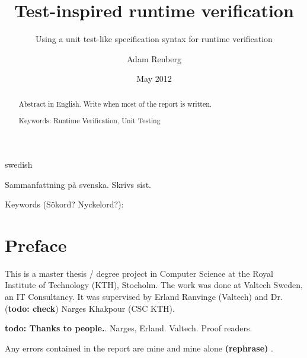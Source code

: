 \documentclass[a4paper,11pt]{kth-mag}
\title{Test-inspired runtime verification}
\subtitle{Using a unit test-like
specification syntax for runtime verification}
\author{Adam Renberg}
\date{May 2012}
\newcommand{\todo}[1]{\textbf{todo: #1}}
\newcommand{\rephrase}{\textbf{(rephrase)} }
\begin{document}
\lstset{basicstyle=\ttfamily, tabsize=2, showspaces=false,
showstringspaces=false, numbersep=20pt}

\frontmatter
\pagestyle{empty}
\removepagenumbers
\maketitle
{}





\begin{abstract}

Abstract in English. Write when most of the report is written.

\bigskip\noindent
Keywords: Runtime Verification, Unit Testing
\end{abstract}
\clearpage

\begin{foreignabstract}{swedish}

Sammanfattning på svenska. Skrivs sist.

\bigskip\noindent
Keywords (Sökord? Nyckelord?):
\end{foreignabstract}
\clearpage





\pagestyle{newchap}
\chapter*{Preface}

This is a master thesis / degree project in Computer Science at the Royal
Institute of Technology (KTH), Stocholm. The work was done at Valtech Sweden,
an IT Consultancy. It was supervised by Erland Ranvinge (Valtech) and Dr.
(\todo{check}) Narges Khakpour (CSC KTH).

\todo{Thanks to people.}. Narges, Erland. Valtech. Proof readers.

Any errors contained in the report are mine and mine alone \rephrase.
\clearpage

\pagestyle{newchap}
\tableofcontents*
\mainmatter




\end{document}

